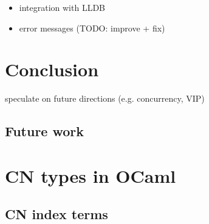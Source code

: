 \documentclass[withindex,glossary]{cam-thesis}
\begin{document}






\begin{itemize}
  \item integration with LLDB
  \item error messages (TODO: improve + fix)
\end{itemize}

\chapter{Conclusion}

speculate on future directions (e.g. concurrency, VIP)

\section{Future work}








\appendix

\chapter{CN types in OCaml}

\section{CN index terms}\label{sec:cn-index-terms}
\end{document}
